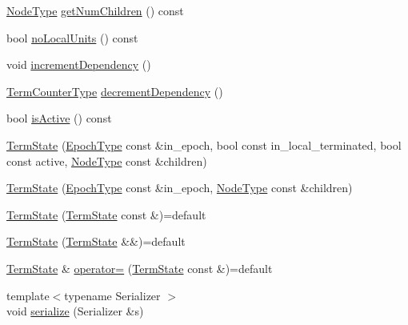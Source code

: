 \begin{DoxyCompactItemize}
\item 
\hyperlink{namespacevt_a866da9d0efc19c0a1ce79e9e492f47e2}{Node\+Type} \hyperlink{structvt_1_1term_1_1_term_state_ac3b42954f6cc609be8a40639e8a9a9a9}{get\+Num\+Children} () const
\item 
bool \hyperlink{structvt_1_1term_1_1_term_state_a6fd3b2a3c99002110ed7cfea8e30f021}{no\+Local\+Units} () const
\item 
void \hyperlink{structvt_1_1term_1_1_term_state_a109f0e5a978106ca6b8de01c5678b621}{increment\+Dependency} ()
\item 
\hyperlink{namespacevt_1_1term_a4fd378cdb0c36683afc1b3399d685f7f}{Term\+Counter\+Type} \hyperlink{structvt_1_1term_1_1_term_state_addc61edaf5b324db422a7e857890b314}{decrement\+Dependency} ()
\item 
bool \hyperlink{structvt_1_1term_1_1_term_state_a9fd406188be289ed6722555dffd9fe50}{is\+Active} () const
\item 
\hyperlink{structvt_1_1term_1_1_term_state_a6949c80d5206b322eb0034ad17aa0ad0}{Term\+State} (\hyperlink{namespacevt_a81d11b28122d43bf9834577e4a06440f}{Epoch\+Type} const \&in\+\_\+epoch, bool const in\+\_\+local\+\_\+terminated, bool const active, \hyperlink{namespacevt_a866da9d0efc19c0a1ce79e9e492f47e2}{Node\+Type} const \&children)
\item 
\hyperlink{structvt_1_1term_1_1_term_state_a07b3f0ad915aee5a30d526e6172f3f90}{Term\+State} (\hyperlink{namespacevt_a81d11b28122d43bf9834577e4a06440f}{Epoch\+Type} const \&in\+\_\+epoch, \hyperlink{namespacevt_a866da9d0efc19c0a1ce79e9e492f47e2}{Node\+Type} const \&children)
\item 
\hyperlink{structvt_1_1term_1_1_term_state_a5a4f1285d03b0a2b1934e61bceb352c3}{Term\+State} (\hyperlink{structvt_1_1term_1_1_term_state}{Term\+State} const \&)=default
\item 
\hyperlink{structvt_1_1term_1_1_term_state_ae3b24cd9d0097422d6e1a35fc169fe4b}{Term\+State} (\hyperlink{structvt_1_1term_1_1_term_state}{Term\+State} \&\&)=default
\item 
\hyperlink{structvt_1_1term_1_1_term_state}{Term\+State} \& \hyperlink{structvt_1_1term_1_1_term_state_ac440f590ac59cb7c5b9560ca760fbc69}{operator=} (\hyperlink{structvt_1_1term_1_1_term_state}{Term\+State} const \&)=default
\item 
{\footnotesize template$<$typename Serializer $>$ }\\void \hyperlink{structvt_1_1term_1_1_term_state_adb41f4c46d2c270df3ccfcb479f9943d}{serialize} (Serializer \&s)
\end{DoxyCompactItemize}
